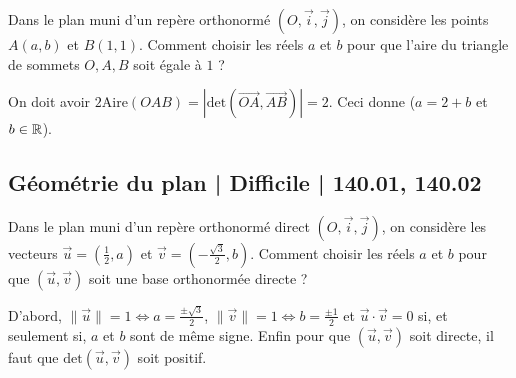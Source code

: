 \begin{question}
Dans le plan muni d'un repère orthonormé $(O,\vec{i},\vec{j})$, on considère les points $\displaystyle A(a,b)$ et $\displaystyle B(1,1)$. Comment choisir les réels $a$ et $b$ pour que l'aire du triangle de sommets $O,A,B$ soit égale à $1$ ?
\begin{answers}  
\end{answers}
\begin{explanations}
On doit avoir $\displaystyle 2\mbox{Aire}(OAB)=\left|\mbox{det}\left(\overrightarrow{OA},\overrightarrow{AB}\right)\right|=2$. Ceci donne ($a=2+b$ et $b\in \mathbb{R}$).
\end{explanations}
\end{question}



\subsection{Géométrie du plan | Difficile | 140.01, 140.02}


\begin{question}
Dans le plan muni d'un repère orthonormé direct $(O,\vec{i},\vec{j})$, on considère les vecteurs $\displaystyle \vec{u}=\left(\frac{1}{2},a\right)$ et $\displaystyle \vec{v}=\left(-\frac{\sqrt{3}}{2},b\right)$. Comment choisir les réels $a$ et $b$ pour que $(\vec{u},\vec{v})$ soit une base orthonormée directe ?
\begin{answers}  
\end{answers}
\begin{explanations}
D'abord, $\displaystyle \|\vec{u}\|=1\Leftrightarrow a=\frac{\pm \sqrt{3}}{2}$, $\displaystyle \|\vec{v}\|=1\Leftrightarrow b=\frac{\pm 1}{2}$ et $\vec{u}\cdot\vec{v}=0$ si, et seulement si, $a$ et $b$ sont de même signe. Enfin pour que $(\vec{u},\vec{v})$ soit directe, il faut que $\mbox{det}(\vec{u},\vec{v})$ soit positif.
\end{explanations}
\end{question}



